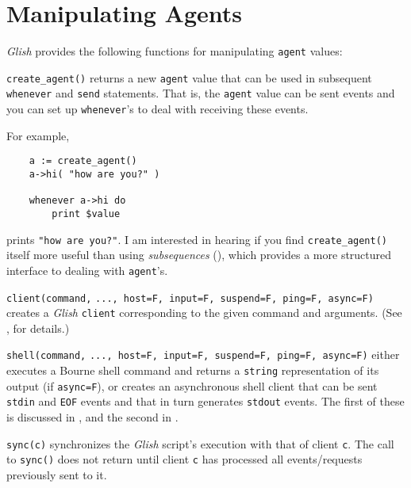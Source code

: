 \section{Manipulating Agents}
\label{predefined-agents}

{\em Glish} provides the following functions for manipulating {\tt agent}
values:
\begin{sloppy}
\begin{list}{}{}

\item[{\tt create\_agent()}] \label{create_agent-func} 
returns a new {\tt agent} value that
can be used in subsequent {\tt whenever} and {\tt send}
statements.  That is, the {\tt agent} value can be sent events and
you can set up {\tt whenever}'s to deal with receiving these events.

For example,
\begin{verbatim}
    a := create_agent()
    a->hi( "how are you?" )

    whenever a->hi do
        print $value
\end{verbatim}
prints {\tt "how are you?"}.  I am interested in hearing if
you find {\tt create\_agent()} itself more useful than using
{\em subsequences} (), which provides a more structured
interface to dealing with {\tt agent}'s.

\item[{\tt client(command,}] {\tt ..., host=F, input=F, suspend=F,
ping=F, async=F)}
\label{client-func}
creates a {\em Glish} {\tt client} corresponding to the given command and arguments.
(See , for details.)

\item[{\tt shell(command,}] {\tt ..., host=F, input=F, suspend=F,
ping=F, async=F)}
\label{shell-func}
either executes a Bourne shell command and returns a {\tt string} representation
of its output (if {\tt async=F}), or creates an asynchronous shell client
that can be sent {\tt stdin} and {\tt EOF} events and that in turn generates
{\tt stdout} events.  The first of these is discussed in ,
and the second in .

\item[{\tt sync(c)}] \label{sync-func}
synchronizes the {\em Glish} script's execution with that of client {\tt c}.
The call to {\tt sync()} does not return until client {\tt c} has
processed all events/requests previously sent to it.


\end{list}
\end{sloppy}
